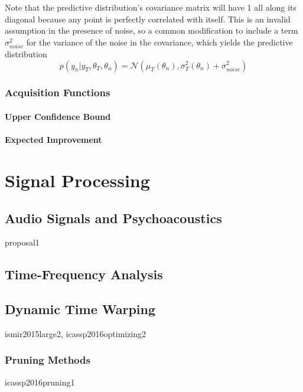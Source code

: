 Note that the predictive distribution's covariance matrix will have 1 all along its diagonal because any point is perfectly correlated with itself. 
This is an invalid assumption in the presence of noise, so a common modification to include a term $\sigma_{noise}^2$ for the variance of the noise in the covariance, which yields the predictive distribution
\begin{equation}
p(y_{n} | y_T, \theta_T, \theta_n) = \mathcal{N}(\mu_T(\theta_n), \sigma_T^2(\theta_n) + \sigma_{noise}^2)
\end{equation}

\subsubsection{Acquisition Functions}

\paragraph{Upper Confidence Bound}

\paragraph{Expected Improvement}

\section{Signal Processing}

\subsection{Audio Signals and Psychoacoustics}

proposal1

\subsection{Time-Frequency Analysis}

\subsection{Dynamic Time Warping}

ismir2015large2, icassp2016optimizing2

\subsubsection{Pruning Methods}

icassp2016pruning1
